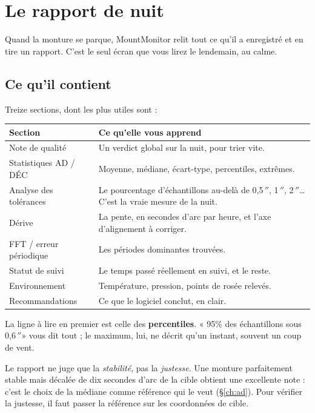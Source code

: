 \documentclass[a4paper,11pt,twoside]{report}
\newcommand{\arcsec}{\ensuremath{''}}
\begin{document}
\chapter{Le rapport de nuit}

Quand la monture se parque, MountMonitor relit tout ce qu'il a enregistré et
en tire un rapport. C'est le seul écran que vous lirez le lendemain, au
calme.

\section{Ce qu'il contient}

Treize sections, dont les plus utiles sont :

\begin{center}
\begin{tabularx}{\textwidth}{lX}
\toprule
\textbf{Section} & \textbf{Ce qu'elle vous apprend} \\
\midrule
Note de qualité & Un verdict global sur la nuit, pour trier vite. \\
Statistiques AD / DÉC & Moyenne, médiane, écart-type, percentiles, extrêmes. \\
Analyse des tolérances & Le pourcentage d'échantillons au-delà de 0,5\,\arcsec,
1\,\arcsec, 2\,\arcsec\ldots{} C'est la vraie mesure de la nuit. \\
Dérive & La pente, en secondes d'arc par heure, et l'axe d'alignement à
corriger. \\
FFT / erreur périodique & Les périodes dominantes trouvées. \\
Statut de suivi & Le temps passé réellement en suivi, et le reste. \\
Environnement & Température, pression, points de rosée relevés. \\
Recommandations & Ce que le logiciel conclut, en clair. \\
\bottomrule
\end{tabularx}
\end{center}

\begin{tip}
La ligne à lire en premier est celle des \textbf{percentiles}. « 95\% des
échantillons sous 0,6\,\arcsec » vous dit tout ; le maximum, lui, ne
décrit qu'un instant, souvent un coup de vent.
\end{tip}

\begin{warning}
Le rapport ne juge que la \emph{stabilité}, pas la \emph{justesse}. Une
monture parfaitement stable mais décalée de dix secondes d'arc de la cible
obtient une excellente note : c'est le choix de la médiane comme référence
qui le veut (\S\ref{ch:ad}). Pour vérifier la justesse, il faut passer la
référence sur les coordonnées de cible.
\end{warning}
\end{document}
